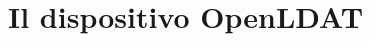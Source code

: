 \setlength{\parskip}{1em}
\setlength{\parindent}{0pt}
\chapter{Il dispositivo OpenLDAT}
\label{chap:device}




